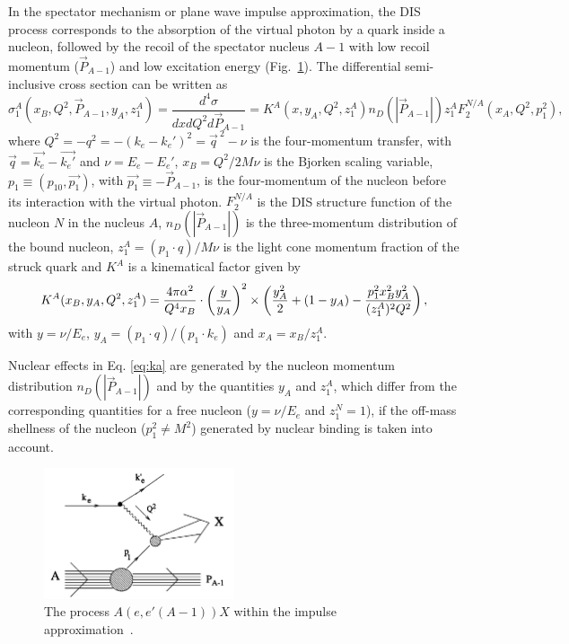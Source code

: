 In the spectator mechanism or plane wave impulse approximation, the DIS process corresponds to the absorption of the virtual photon by a quark inside a nucleon, followed by the recoil of the spectator nucleus $A-1$ with low recoil momentum ($\vec P_{A-1}$) and low excitation energy (Fig.~\ref{fig:spectator}). The differential semi-inclusive cross section can be written as~\cite{CiofidegliAtti1999}
\begin{equation}
\sigma_1^A (x_B,Q^2,\vec P_{A-1},y_A,z_1^A)= \frac{d^4\sigma}{dxdQ^2d\vec P_{A-1}} = K^A(x,y_A,Q^2,z_1^A)n_D(|\vec P_{A-1}|)z_1^AF_2^{N/A}(x_A,Q^2,p_1^2),
\label{eq:xs}
\end{equation}
where $Q^2 = -q^2 = -(k_e - k_e')^2 = \vec{q}^{\:2} - \nu$ is the four-momentum transfer, with $\vec{q} = \vec{k_e} - \vec{k_e'}$ and $\nu = E_e - E_e'$, $x_B = Q^2/2 M \nu$ is the Bjorken scaling variable, $p_1 \equiv (p_{10}, \vec{p_1})$, with $\vec{p_1} \equiv - \vec P_{A-1}$, is the four-momentum of the nucleon before its interaction with the virtual photon. $F_2^{N/A}$ is the DIS structure function of the nucleon $N$ in the nucleus $A$, $n_D(|\vec P_{A-1}|)$ is the three-momentum distribution of the bound nucleon, $z^{A}_{1} = {(p_1\cdot q)}/{M\nu}$ is the light cone momentum fraction of the struck quark and $K^A$ is a kinematical factor given by 
\begin{equation}
K^A(x_B,y_A,Q^2,z_1^A) = { 4 \pi \alpha^2 \over Q^4 x_B } \cdot \left( {y \over y_A} \right) ^2 \times \left( {y_A^2 \over 2} + (1-y_A) - {p_1^2x_B^2y_A^2 \over (z_1^A)^2 Q^2 } \right),
\label{eq:ka}
\end{equation}
with $y= \nu / E_e$, $y_A = (p_1 \cdot q)/ (p_1 \cdot k_e)$ and $x_A = x_B / z_1^A$.

Nuclear effects in Eq. \ref{eq:ka} are generated by the nucleon momentum distribution $n_D(|\vec P_{A-1}|)$ and by the quantities $y_A$ and $z^{A}_{1}$, which differ from the corresponding quantities for a free 
nucleon ($y= \nu / E_e$ and $z^{N}_{1} = 1$), if the off-mass shellness of the nucleon ($p_1^2 \neq M^2$) generated by nuclear binding is taken into account.

\begin{figure}[t]
  \begin{center}
    \includegraphics[angle=0, width=0.5\textwidth]{./fig-chap1/spectator}
    \caption{The process $A(e,e'(A-1))X$ within the impulse approximation~\cite{CiofidegliAtti1999}.}
    \label{fig:spectator}
  \end{center}
\end{figure}

